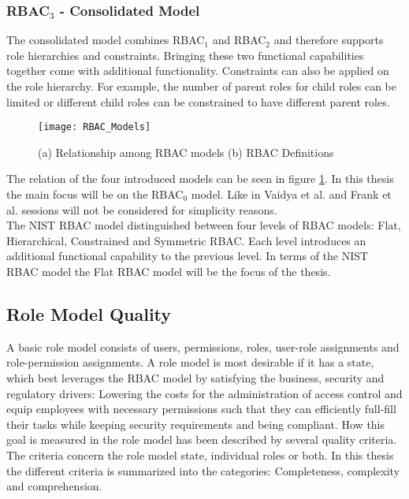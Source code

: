         \subsubsection{RBAC$_3$ - Consolidated Model}
            The consolidated model combines RBAC$_1$ and RBAC$_2$ and therefore supports role hierarchies and constraints. Bringing these two functional capabilities together come with additional functionality. Constraints can also be applied on the role hierarchy. For example, the number of parent roles for child roles can be limited or different child roles can be constrained to have different parent roles.\\
    \begin{figure}[H]
        \centering
        \texttt{[image: RBAC\_Models]}
        \caption{(a) Relationship among RBAC models\cite{Sandhu:1996} (b) RBAC Definitions\cite{tassey2002economic}}
        \label{fig:rbacmodels}
    \end{figure}
    The relation of the four introduced models can be seen in figure \ref{fig:rbacmodels}. In this thesis the main focus will be on the RBAC$_0$ model. Like in Vaidya et al.\cite{Vaidya:2007} and Frank et al.\cite{Frank:2013} sessions will not be considered for simplicity reasons.\\
    The NIST RBAC model \cite{sandhu2000nist} distinguished between four levels of RBAC models: Flat, Hierarchical, Constrained and Symmetric RBAC. Each level introduces an additional functional capability to the previous level. In terms of the NIST RBAC model the Flat RBAC model will be the focus of the thesis.
    
    \subsection{Role Model Quality}
    \label{sec:rmQuality}
    A basic role model consists of users, permissions, roles, user-role assignments and role-permission assignments. A role model is most desirable if it has a state, which best leverages the RBAC model by satisfying the business, security and regulatory drivers: Lowering the costs for the administration of access control and equip employees with necessary permissions such that they can efficiently full-fill their tasks while keeping security requirements and being compliant.
    How this goal is measured in the role model has been described by several quality criteria\cite{Kunz}\cite{Frank}. The criteria concern the role model state, individual roles or both. In this thesis the different criteria is summarized into the categories: Completeness, complexity and comprehension.
